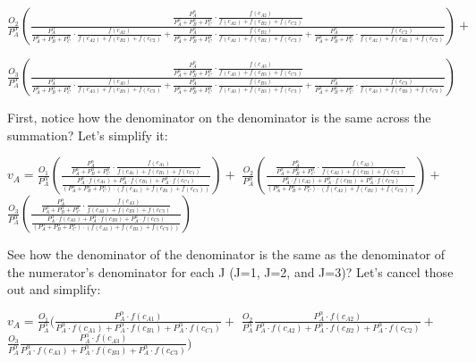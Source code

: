 \documentclass[]{elsarticle} %
\begin{document}
\(\frac{O_2}{P_{A}^\alpha}(\frac{\frac{P_{A}^\alpha}{P_{A}^\alpha+P_{B}^\alpha+P_{C}^\alpha} \cdot \frac{f(c_{A2})}{f(c_{A2})+f(c_{B2})+f(c_{C2})}}{\frac{P_{A}^\alpha}{P_{A}^\alpha+P_{B}^\alpha+P_{C}^\alpha} \cdot \frac{f(c_{A2})}{f(c_{A2})+f(c_{B2})+f(c_{C2})} + \frac{P_{A}^\alpha}{P_{A}^\alpha+P_{B}^\alpha+P_{C}^\alpha} \cdot \frac{f(c_{B2})}{f(c_{A2})+f(c_{B2})+f(c_{C2})}+\frac{P_{A}^\alpha}{P_{A}^\alpha+P_{B}^\alpha+P_{C}^\alpha} \cdot \frac{f(c_{C2})}{f(c_{A2})+f(c_{B2})+f(c_{C2})}} )+\)

\(\frac{O_3}{P_{A}^\alpha}(\frac{\frac{P_{A}^\alpha}{P_{A}^\alpha+P_{B}^\alpha+P_{C}^\alpha} \cdot \frac{f(c_{A3})}{f(c_{A3})+f(c_{B3})+f(c_{C3})}}{\frac{P_{A}^\alpha}{P_{A}^\alpha+P_{B}^\alpha+P_{C}^\alpha} \cdot \frac{f(c_{A3})}{f(c_{A3})+f(c_{B3})+f(c_{C3})} + \frac{P_{A}^\alpha}{P_{A}^\alpha+P_{B}^\alpha+P_{C}^\alpha} \cdot \frac{f(c_{B3})}{f(c_{A3})+f(c_{B3})+f(c_{C3})}+\frac{P_{A}^\alpha}{P_{A}^\alpha+P_{B}^\alpha+P_{C}^\alpha} \cdot \frac{f(c_{C3})}{f(c_{A3})+f(c_{B3})+f(c_{C3})}} )\)

First, notice how the denominator on the denominator is the same across
the summation? Let's simplify it:

\(v_{A} = \frac{O_1}{P_{A}^\alpha}(\frac{\frac{P_{A}^\alpha}{P_{A}^\alpha+P_{B}^\alpha+P_{C}^\alpha} \cdot \frac{f(c_{A1})}{f(c_{A1})+f(c_{B1})+f(c_{C1})}}{\frac{P_{A}^\alpha \cdot f(c_{A1}) + P_{A}^\alpha \cdot f(c_{B1}) + P_{A}^\alpha \cdot f(c_{C1})}{(P_{A}^\alpha+P_{B}^\alpha+P_{C}^\alpha) \cdot (f(c_{A1})+f(c_{B1})+f(c_{C1}))}}) +\)
\(\frac{O_2}{P_{A}^\alpha}(\frac{\frac{P_{A}^\alpha}{P_{A}^\alpha+P_{B}^\alpha+P_{C}^\alpha} \cdot \frac{f(c_{A2})}{f(c_{A2})+f(c_{B2})+f(c_{C2})}}{\frac{P_{A}^\alpha \cdot f(c_{A2}) + P_{A}^\alpha \cdot f(c_{B2}) + P_{A}^\alpha \cdot f(c_{C2})}{(P_{A}^\alpha+P_{B}^\alpha+P_{C}^\alpha) \cdot (f(c_{A2})+f(c_{B2})+f(c_{C2}))}}) +\)
\(\frac{O_3}{P_{A}^\alpha}(\frac{\frac{P_{A}^\alpha}{P_{A}^\alpha+P_{B}^\alpha+P_{C}^\alpha} \cdot \frac{f(c_{A3})}{f(c_{A3})+f(c_{B3})+f(c_{C3})}}{\frac{P_{A}^\alpha \cdot f(c_{A3}) + P_{A}^\alpha \cdot f(c_{B3}) + P_{A}^\alpha \cdot f(c_{C3})}{(P_{A}^\alpha+P_{B}^\alpha+P_{C}^\alpha) \cdot (f(c_{A3})+f(c_{B3})+f(c_{C3}))}} )\)

See how the denominator of the denominator is the same as the
denominator of the numerator's denominator for each J (J=1, J=2, and
J=3)? Let's cancel those out and simplify:

\(v_{A} = \frac{O_1}{P_{A}^\alpha}(\frac{P_{A}^\alpha \cdot f(c_{A1})}{P_{A}^\alpha \cdot f(c_{A1}) + P_{A}^\alpha \cdot f(c_{B1}) + P_{A}^\alpha \cdot f(c_{C1})} +\)
\(\frac{O_2}{P_{A}^\alpha}\frac{P_{A}^\alpha \cdot f(c_{A2})}{P_{A}^\alpha \cdot f(c_{A2}) + P_{A}^\alpha \cdot f(c_{B2}) + P_{A}^\alpha \cdot f(c_{C2})} +\)
\(\frac{O_3}{P_{A}^\alpha}\frac{P_{A}^\alpha \cdot f(c_{A3})}{P_{A}^\alpha \cdot f(c_{A3}) + P_{A}^\alpha \cdot f(c_{B3}) + P_{A}^\alpha \cdot f(c_{C3})} )\)
\end{document}
